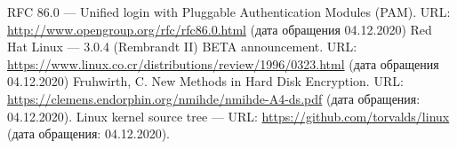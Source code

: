 
\begin{thebibliography}{3}
 RFC 86.0 — Unified login with Pluggable Authentication Modules (PAM). URL: \url{http://www.opengroup.org/rfc/rfc86.0.html} (дата обращения 04.12.2020)
 Red Hat Linux — 3.0.4 (Rembrandt II) BETA announcement. URL: \url{https://www.linux.co.cr/distributions/review/1996/0323.html} (дата обращения 04.12.2020)
 Fruhwirth, C. New Methods in Hard Disk Encryption. URL: \url{https://clemens.endorphin.org/nmihde/nmihde-A4-ds.pdf} (дата обращения: 04.12.2020).
 Linux kernel source tree — URL: \url{https://github.com/torvalds/linux} (дата обращения: 04.12.2020).
\end{thebibliography}
